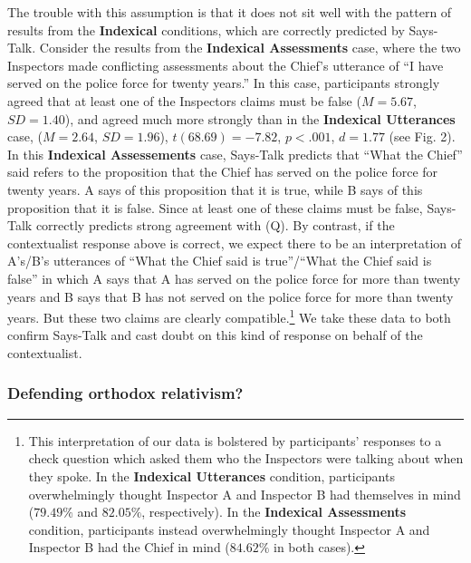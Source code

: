 \documentclass[11pt]{article}
\begin{document}
\begin{doublespace}
The trouble with this assumption is that it does not sit well with the pattern of results from the \textbf{Indexical} conditions, which are correctly predicted by {\sc Says-Talk}. Consider the results from the {\bf Indexical Assessments} case, where the two Inspectors made conflicting assessments about the Chief's utterance of ``I have served on the police force for twenty years.'' In this case, participants strongly agreed that at least one of the Inspectors claims must be false ($M = 5.67$, $SD = 1.40$), and agreed much more strongly than in the \textbf{Indexical Utterances} case, ($M = 2.64$, $SD = 1.96$), $t(68.69) = -7.82$, $p < .001$, $d = 1.77$ (see Fig. 2). In this \textbf{Indexical Assessements} case, {\sc Says-Talk} predicts that ``What the Chief'' said refers to the proposition that the Chief has served on the police force for twenty years. A says of this proposition that it is true, while B says of this proposition that it is false. Since at least one of these claims must be false, {\sc Says-Talk} correctly predicts strong agreement with (Q). By contrast, if the contextualist response above is correct, we expect there to be an interpretation of A's/B's utterances of ``What the Chief said is true''/``What the Chief said is false'' in which A says that A has served on the police force for more than twenty years and B says that B has not served on the police force for more than twenty years. But these two claims are clearly compatible.\footnote{This interpretation of our data is bolstered by participants' responses to a check question which asked them who the Inspectors were talking about when they spoke. In the \textbf{Indexical Utterances} condition, participants overwhelmingly thought Inspector A and Inspector B had themselves in mind ($79.49\%$ and $82.05\%$, respectively). In the \textbf{Indexical Assessments} condition, participants instead overwhelmingly thought Inspector A and Inspector B had the Chief in mind ($84.62\%$ in both cases).} We take these data to both confirm {\sc Says-Talk} and cast doubt on this kind of response on behalf of the contextualist.

\subsubsection{Defending orthodox relativism?}


\end{doublespace}
\end{document}
